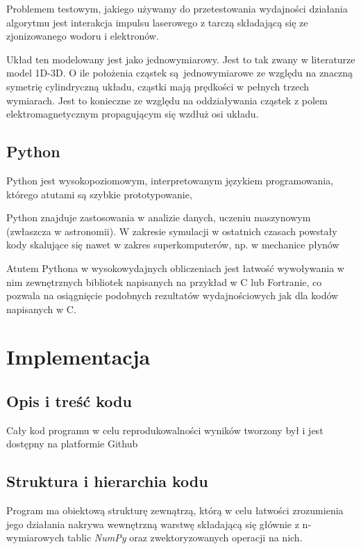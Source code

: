 Problemem testowym, jakiego używamy do przetestowania wydajności działania algorytmu jest
interakcja impulsu laserowego z tarczą składającą się ze zjonizowanego wodoru i elektronów.

Układ ten modelowany jest jako jednowymiarowy. Jest to tak zwany w literaturze model 1D-3D. O ile położenia cząstek
są jednowymiarowe ze względu na znaczną symetrię
cylindryczną układu, cząstki mają prędkości w pełnych trzech wymiarach. Jest to konieczne ze względu
na oddziaływania cząstek z polem elektromagnetycznym propagującym się wzdłuż osi układu.

\subsection{Python}
Python jest wysokopoziomowym, interpretowanym językiem programowania, którego atutami są szybkie prototypowanie,

Python znajduje zastosowania w analizie danych, uczeniu maszynowym (zwłaszcza w astronomii). W zakresie symulacji
w ostatnich czasach powstały kody skalujące się nawet w zakres superkomputerów, np. w mechanice płynów %

Atutem Pythona w wysokowydajnych obliczeniach jest łatwość wywoływania w nim zewnętrznych bibliotek napisanych
na przykład w C lub Fortranie, co pozwala na osiągnięcie podobnych rezultatów wydajnościowych jak dla kodów
napisanych w C.


\section[Implementacja]{Implementacja}%
\subsection{Opis i treść kodu}
Cały kod programu w celu reprodukowalności wyników tworzony był i jest dostępny na platformie Github %

\subsection{Struktura i hierarchia kodu}

Program ma obiektową strukturę zewnątrzą, którą w celu łatwości zrozumienia jego działania nakrywa wewnętrzną warstwę
składającą się głównie z n-wymiarowych tablic \emph{NumPy} oraz zwektoryzowanych operacji na nich.

